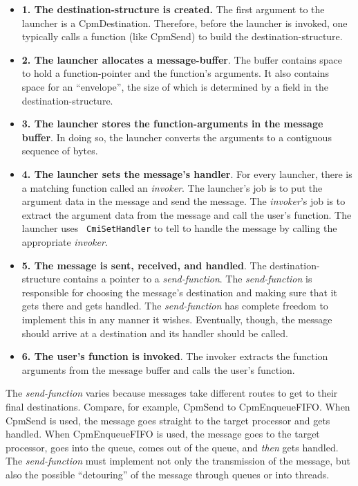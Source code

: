 \begin{itemize}

\item[]{{\bf 1. The destination-structure is created.}  The first
argument to the launcher is a CpmDestination.  Therefore, before the
launcher is invoked, one typically calls a function (like CpmSend)
to build the destination-structure.}

\item[]{{\bf 2. The launcher allocates a message-buffer}.  The buffer
contains space to hold a function-pointer and the function's arguments.
It also contains space for an ``envelope'', the size of which is
determined by a field in the destination-structure.}

\item[]{{\bf 3. The launcher stores the function-arguments in the message
buffer}.  In doing so, the launcher converts the arguments to a
contiguous sequence of bytes.}

\item[]{{\bf 4. The launcher sets the message's handler}.  For every
launcher, there is a matching function called an {\it invoker}.  The
launcher's job is to put the argument data in the message and send the
message.  The {\it invoker}'s job is to extract the argument data from
the message and call the user's function.  The launcher uses {\tt
CmiSetHandler} to tell \converse{} to handle the message by calling the
appropriate {\it invoker}.}

\item[]{{\bf 5. The message is sent, received, and handled}. 
The destination-structure contains a pointer to a {\it send-function}.
The {\it send-function} is responsible for choosing the message's
destination and making sure that it gets there and gets handled.  The
{\it send-function} has complete freedom to implement this in any
manner it wishes.  Eventually, though, the message should arrive at a
destination and its handler should be called.}

\item[]{{\bf 6. The user's function is invoked}.  The invoker
extracts the function arguments from the message buffer and calls
the user's function.}

\end{itemize}

The {\it send-function} varies because messages take different
routes to get to their final destinations.  Compare, for example,
CpmSend to CpmEnqueueFIFO.  When CpmSend is used, the message goes
straight to the target processor and gets handled.  When
CpmEnqueueFIFO is used, the message goes to the target processor, goes
into the queue, comes out of the queue, and {\it then} gets handled.
The {\it send-function} must implement not only the transmission of
the message, but also the possible ``detouring'' of the message
through queues or into threads.

